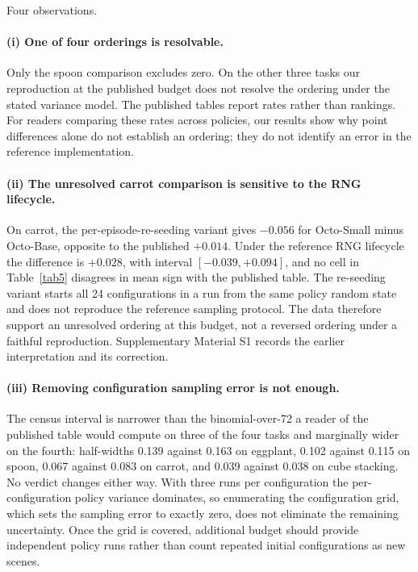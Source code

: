 \documentclass[pdflatex,iicol,sn-apa]{sn-jnl}
\theoremstyle{remark}
\begin{document}
Four observations.

\paragraph{(i) One of four orderings is resolvable.}
Only the spoon comparison excludes zero. On the other three tasks our reproduction at the published
budget does not resolve the ordering under the stated variance model. The published tables report
rates rather than rankings. For readers comparing these rates across policies, our results show
why point differences alone do not establish an ordering; they do not identify an error in the
reference implementation.

\paragraph{(ii) The unresolved carrot comparison is sensitive to the RNG lifecycle.}
On carrot, the per-episode-re-seeding variant gives $-0.056$ for Octo-Small minus Octo-Base,
opposite to the published $+0.014$. Under the reference RNG lifecycle the difference is $+0.028$,
with interval $[-0.039, +0.094]$, and no cell in Table~\ref{tab5} disagrees in mean sign with the
published table. The re-seeding variant starts all 24 configurations in a run from the same policy
random state and does not reproduce the reference sampling protocol.
The data therefore support an unresolved ordering at this budget, not a reversed ordering under
a faithful reproduction. Supplementary Material S1 records the earlier interpretation and its correction.

\paragraph{(iii) Removing configuration sampling error is not enough.}
The census interval is narrower than the binomial-over-72 a reader of the published table would
compute on three of the four tasks and marginally wider on the fourth: half-widths 0.139 against
0.163 on eggplant, 0.102 against 0.115 on spoon, 0.067 against 0.083 on carrot, and 0.039 against
0.038 on cube stacking. No verdict changes either way. With three runs per configuration the
per-configuration policy variance dominates, so enumerating the configuration grid, which sets the
sampling error to exactly zero, does not eliminate the remaining uncertainty. Once the grid is
covered, additional budget should provide independent policy runs rather than count repeated initial
configurations as new scenes.
\end{document}
